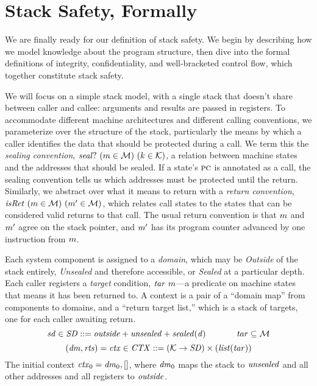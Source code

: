 \documentclass[acmsmall,review,anonymous]{acmart}\settopmatter{printfolios=true,printccs=false,printacmref=false}
\begin{document}
{\section{Stack Safety, Formally}
\label{sec:lse}

We are finally ready for our definition of stack safety. We begin
by describing how we model knowledge about the program structure,
then dive into the formal definitions of integrity, confidentiality, and
well-bracketed control flow, which together constitute stack safety.

We will focus on a simple stack model, with a single stack
that doesn't share between caller and callee: arguments and results are passed
in registers. To accommodate different machine architectures and different calling
conventions, we parameterize over the structure of the stack, particularly
the means by
which a caller identifies the data that should be protected during a call. We term
this the {\em sealing convention},
\(\mathit{seal?} ~ (m \in {\mathcal M}) ~ (k \in {\mathcal K})\), a
relation between machine states and the addresses that should be sealed.
If a state's \(\textsc{pc}\) is annotated as a call, the sealing convention tells us
which addresses must be protected until the return. Similarly, we abstract over what
it means to return with a {\em return convention},
\(\mathit{isRet} ~ (m \in {\mathcal M}) ~ (m' \in {\mathcal M})\),
which relates call states to the states that can be considered valid returns to that call.
The usual return convention is that \(m\) and \(m'\) agree on the stack pointer,
and \(m'\) has its program counter advanced by one instruction from \(m\).

Each system component is assigned to a {\em domain}, which may be {\em Outside}
of the stack entirely, {\em Unsealed} and therefore accessible, or {\em Sealed}
at a particular depth. Each caller registers a {\em target}
condition, \(\mathit{tar} ~ m\)---a predicate on machine states that means it
has been returned to.
A context is a pair of a ``domain map'' from components to domains, and a
``return target list,'' which is a stack of targets, one for each caller awaiting
return.
%
\[\mathit{sd} \in \mathit{SD} ::= \mathit{outside} + \mathit{unsealed} + \mathit{sealed(d)} \hspace*{0.5in} \mathit{tar} \subseteq {\mathcal M}\]
\[(\mathit{dm},\mathit{rts}) = \mathit{ctx} \in \mathit{CTX} ::= ({\mathcal K} \rightarrow \mathit{SD})
  \times (\mathit{list} (\mathit{tar})) \]
%
The initial context \(\mathit{ctx}_0 = \mathit{dm}_0, []\), where \(\mathit{dm}_0\) maps
the stack to \(\mathit{unsealed}\) and all other addresses and all registers to \(\mathit{outside}\).

}
\end{document}

